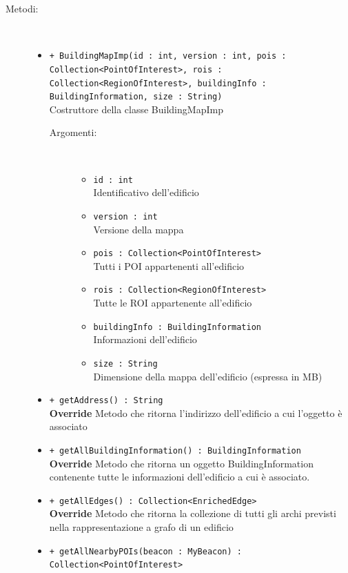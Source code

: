 \documentclass[../DefinizioneDiProdotto.tex]{subfiles}
\begin{document}
\begin{description}
\begin{itemize}
\end{itemize}
\item[Metodi:] \
\begin{itemize}
\item \texttt{+ BuildingMapImp(id : int, version : int, pois : \\Collection<PointOfInterest>, rois : Collection<RegionOfInterest>, buildingInfo : BuildingInformation, size : String)}\\
Costruttore della classe BuildingMapImp
 \begin{description}
\item[Argomenti:] \
\begin{itemize}
\item \texttt{id : int}\\
Identificativo dell'edificio\item \texttt{version : int}\\
Versione della mappa\item \texttt{pois : Collection<PointOfInterest>}\\
Tutti i POI appartenenti all'edificio\item \texttt{rois : Collection<RegionOfInterest>}\\
Tutte le ROI appartenente all'edificio\item \texttt{buildingInfo : BuildingInformation}\\
Informazioni dell'edificio\item \texttt{size : String}\\
Dimensione della mappa dell'edificio (espressa in MB)\end{itemize}
\end{description}
\item \texttt{+ getAddress() : String}\\
\textbf{Override} Metodo che ritorna l'indirizzo dell'edificio a cui l'oggetto è associato
 \item \texttt{+ getAllBuildingInformation() : BuildingInformation}\\
\textbf{Override} Metodo che ritorna un oggetto BuildingInformation contenente tutte le informazioni dell'edificio a cui è associato.
 \item \texttt{+ getAllEdges() : Collection<EnrichedEdge>}\\
\textbf{Override} Metodo che ritorna la collezione di tutti gli archi previsti nella rappresentazione a grafo di un edificio
 \item \texttt{+ getAllNearbyPOIs(beacon : MyBeacon) : Collection<PointOfInterest>}\\

\end{itemize}
\end{description}
\end{document}
